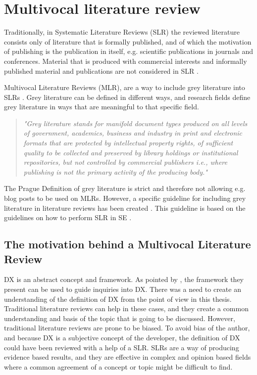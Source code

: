 \documentclass[english, 12pt, a4paper, sci, utf8, a-1b, online]{aaltothesis}
\begin{document}
\clearpage
\section{Multivocal literature review} \label{mlr}

Traditionally, in Systematic Literature Reviews (SLR) the reviewed literature consists only of literature that is formally published, and of which the motivation of publishing is the publication in itself, e.g. scientific publications in journals and conferences. Material that is produced with commercial interests and informally published material and publications are not considered in SLR \citep{guidelines-for-MLR}.

Multivocal Literature Reviews (MLR), are a way to include grey literature into SLRs \citep{the-need-for-MLR}. Grey literature can be defined in different ways, and research fields define grey literature in ways that are meaningful to that specific field.

\begin{quotation}
  \textit{"Grey literature stands for manifold document types produced on all levels of government, academics, business and industry in print and electronic formats that are protected by intellectual property rights, of sufficient quality to be collected and preserved by library holdings or institutional repositories, but not controlled by commercial publishers i.e., where publishing is not the primary activity of the producing body."} \citep{towards-a-prague-definition-of-grey-literature}
\end{quotation}

The Prague Definition of grey literature is strict and therefore not allowing e.g. blog posts to be used on MLRs. However, a specific guideline for including grey literature in literature reviews has been created \citep{guidelines-for-MLR}. This guideline is based on the guidelines on how to perform SLR in SE \citep{guidelines-for-SLR-in-SE}.

\subsection{The motivation behind a Multivocal Literature Review}

DX is an abstract concept and framework. As pointed by \cite{fagerholm-doctoral-thesis}, the framework they present can be used to guide inquiries into DX. There was a need to create an understanding of the definition of DX from the point of view in this thesis. Traditional literature reviews can help in these cases, and they create a common understanding and basis of the topic that is going to be discussed. However, traditional literature reviews are prone to be biased. To avoid bias of the author, and because DX is a subjective concept of the developer, the definition of DX could have been reviewed with a help of a SLR. SLRs are a way of producing evidence based results, and they are effective in complex and opinion based fields where a common agreement of a concept or topic might be difficult to find.
\end{document}
